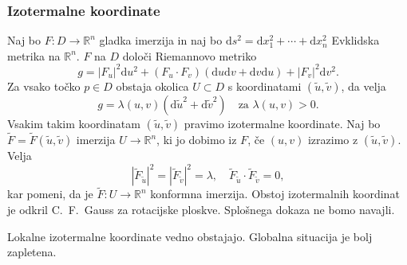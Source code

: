 \documentclass[8pt]{beamer}
\theoremstyle{definition}
\theoremstyle{remark}
\theoremstyle{plain}
\newtheorem{posledica}[definicija]{Posledica}
\numberwithin{equation}{section}  %
\begin{document}
%     
% 
%     

\begin{frame}
    \frametitle{Izotermalne koordinate}

    Naj bo $F: D \rightarrow \mathbb{R}^n$ gladka imerzija in naj bo $\mathrm{d} s^2=\mathrm{d} x_1^2+\cdots+\mathrm{d} x_n^2$ Evklidska metrika na $\mathbb{R}^n$. $F$ na $D$ določi \textcolor{red1}{Riemannovo metriko} 
    \begin{equation*}
        g=\left|F_u\right|^2 \mathrm{d} u^2+\left(F_u \cdot F_v\right)(\mathrm{d} u \mathrm{d} v+\mathrm{d} v \mathrm{d} u)+\left|F_v\right|^2 \mathrm{d} v^2.
    \end{equation*}
    \pause
    Za vsako točko $p \in D$ obstaja okolica $U \subset D$ s koordinatami $(\tilde{u}, \tilde{v})$, da velja 
    \begin{equation*}
        g=\lambda(u,v)\left(\mathrm{d} \tilde{u}^2+\mathrm{d} \tilde{v}^2\right) \quad \text{za } \lambda(u,v) > 0.
    \end{equation*}
    Vsakim takim koordinatam $(\tilde{u}, \tilde{v})$ pravimo \textcolor{red1}{izotermalne koordinate}. \pause Naj bo $\widetilde{F}=\widetilde{F}(\tilde{u}, \tilde{v})$ imerzija $U \rightarrow \mathbb{R}^n$, ki jo dobimo iz $F$, če $(u, v)$ izrazimo z $(\tilde{u}, \tilde{v})$. Velja 
    \begin{equation*}
        \left|\widetilde{F}_{\tilde{u}}\right|^2=\left|\widetilde{F}_{\tilde{v}}\right|^2=\lambda, \quad \widetilde{F}_{\tilde{u}} \cdot \widetilde{F}_{\tilde{v}}=0,
    \end{equation*}
    kar pomeni, da je $\widetilde{F}: U \rightarrow \mathbb{R}^n$ konformna imerzija. Obstoj izotermalnih koordinat je odkril C.~F.~Gauss za rotacijske ploskve. Splošnega dokaza ne bomo navajli.
    \pause 
    \vspace{0.8em}

    Lokalne izotermalne koordinate vedno obstajajo. \textcolor{red1}{Globalna situacija} je bolj zapletena. 
    
\end{frame}
\end{document}
